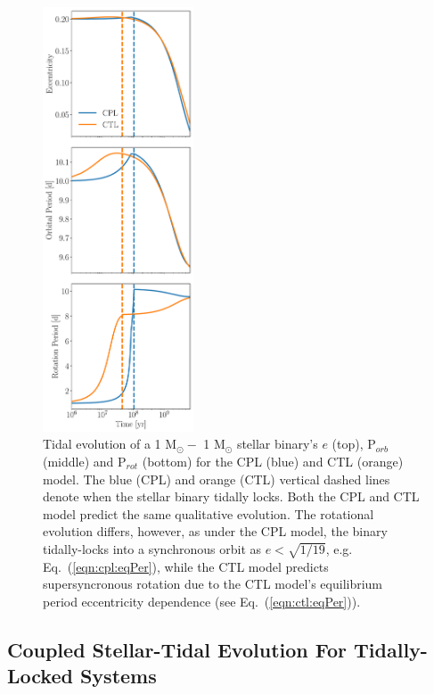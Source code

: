 \documentclass[twocolumn]{aastex61}
\begin{document}
\begin{figure}
	\includegraphics[width=0.4\textwidth]{../Plots/tidalExample.pdf}
   \caption{Tidal evolution of a 1 M$_{\odot} -$ 1 M$_{\odot}$ stellar binary's $e$ (top), P$_{orb}$ (middle) and P$_{rot}$ (bottom) for the CPL (blue) and CTL (orange) model. The blue (CPL) and orange (CTL) vertical dashed lines denote when the stellar binary tidally locks. Both the CPL and CTL model predict the same qualitative evolution. The rotational evolution differs, however, as under the CPL model, the binary tidally-locks into a synchronous orbit as $e < \sqrt{1/19}$, e.g. Eq.~(\ref{eqn:cpl:eqPer}), while the CTL model predicts supersyncronous rotation due to the CTL model's equilibrium period eccentricity dependence (see Eq.~(\ref{eqn:ctl:eqPer})).}%
    \label{fig:tidalExample}%
\end{figure}

\subsection{Coupled Stellar-Tidal Evolution For Tidally-Locked Systems} \label{sec:coupled}
\end{document}
